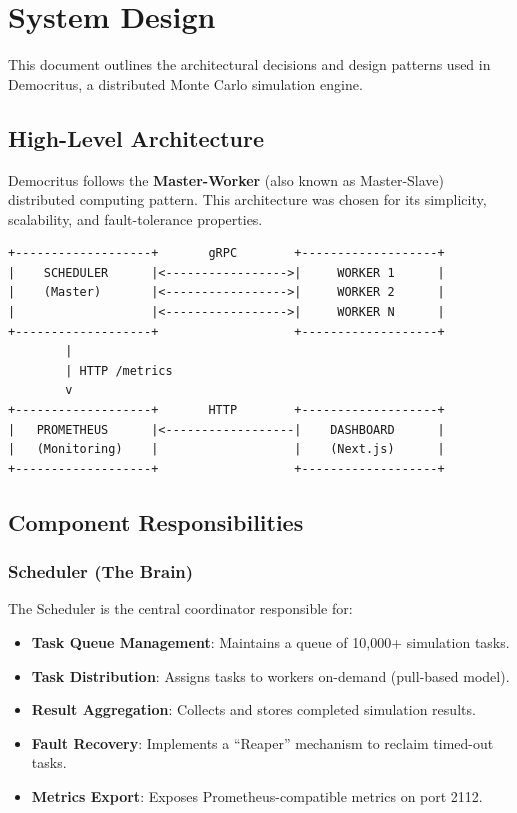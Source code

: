 \section{System Design}

This document outlines the architectural decisions and design patterns used in Democritus, a distributed Monte Carlo simulation engine.

\subsection{High-Level Architecture}

Democritus follows the \textbf{Master-Worker} (also known as Master-Slave) distributed computing pattern. This architecture was chosen for its simplicity, scalability, and fault-tolerance properties.

\begin{verbatim}
+-------------------+       gRPC        +-------------------+
|    SCHEDULER      |<----------------->|     WORKER 1      |
|    (Master)       |<----------------->|     WORKER 2      |
|                   |<----------------->|     WORKER N      |
+-------------------+                   +-------------------+
        |
        | HTTP /metrics
        v
+-------------------+       HTTP        +-------------------+
|   PROMETHEUS      |<------------------|    DASHBOARD      |
|   (Monitoring)    |                   |    (Next.js)      |
+-------------------+                   +-------------------+
\end{verbatim}

\subsection{Component Responsibilities}

\subsubsection{Scheduler (The Brain)}
The Scheduler is the central coordinator responsible for:
\begin{itemize}
    \item \textbf{Task Queue Management}: Maintains a queue of 10,000+ simulation tasks.
    \item \textbf{Task Distribution}: Assigns tasks to workers on-demand (pull-based model).
    \item \textbf{Result Aggregation}: Collects and stores completed simulation results.
    \item \textbf{Fault Recovery}: Implements a ``Reaper'' mechanism to reclaim timed-out tasks.
    \item \textbf{Metrics Export}: Exposes Prometheus-compatible metrics on port 2112.
\end{itemize}

